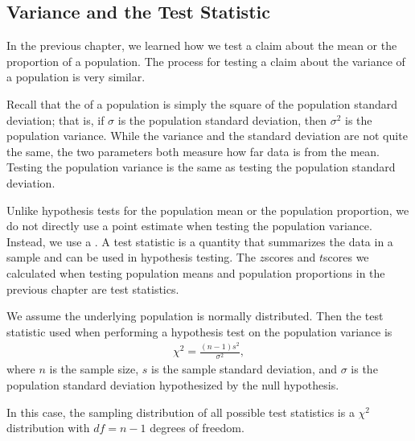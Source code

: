 \documentclass[letterpaper,10pt,english]{jupyterBook}
\begin{document}
\subsection{Variance and the Test Statistic}
\label{\detokenize{Ch7 The Chi-Square Distribution/7.2 Hypothesis Testing for the Population Variance:variance-and-the-test-statistic}}
\sphinxAtStartPar
In the previous chapter, we learned how we test a claim about the mean or the proportion of a population. The process for testing a claim about the variance of a population is very similar.

\sphinxAtStartPar
Recall that the  of a population is simply the square of the population standard deviation; that is, if \(\sigma\) is the population standard deviation, then \(\sigma^2\) is the population variance. While the variance and the standard deviation are not quite the same, the two parameters both measure how far data is from the mean. Testing the population variance is the same as testing the population standard deviation.

\sphinxAtStartPar
Unlike hypothesis tests for the population mean or the population proportion, we do not directly use a point estimate when testing the population variance. Instead, we use a . A test statistic is a quantity that summarizes the data in a sample and can be used in hypothesis testing. The \(z\)\sphinxhyphen{}scores and \(t\)\sphinxhyphen{}scores we calculated when testing population means and population proportions in the previous chapter are test statistics.

\sphinxAtStartPar
We assume the underlying population is normally distributed. Then the test statistic used when performing a hypothesis test on the population variance is
\begin{equation*}
\begin{split} \chi^2 = \frac{(n - 1)s^2}{\sigma^2}, \end{split}
\end{equation*}
\sphinxAtStartPar
where \(n\) is the sample size, \(s\) is the sample standard deviation, and \(\sigma\) is the population standard deviation hypothesized by the null hypothesis.

\sphinxAtStartPar
In this case, the sampling distribution of all possible test statistics is a \(\chi^2\)\sphinxhyphen{}distribution with \(df = n - 1\) degrees of freedom.
\end{document}
